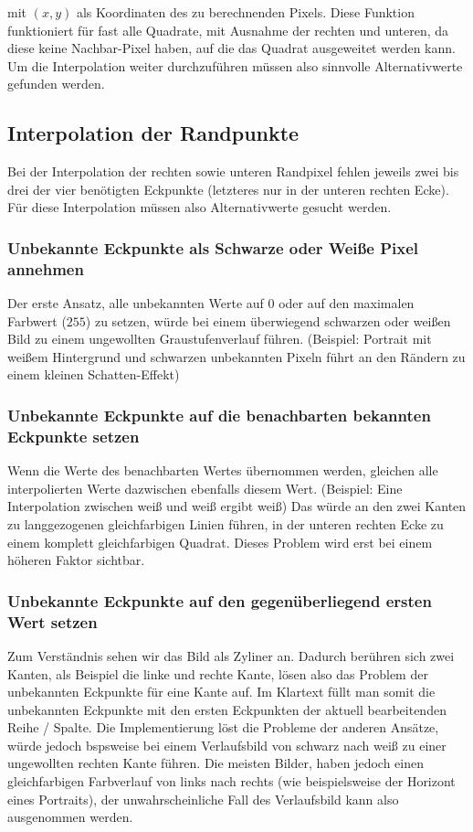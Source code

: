 \documentclass[course=erap]{aspdoc}
\begin{document}
 
mit $(x, y)$ als Koordinaten des zu berechnenden Pixels. Diese Funktion funktioniert für fast alle Quadrate, mit Ausnahme der rechten und unteren, da diese keine Nachbar-Pixel haben, auf die das Quadrat ausgeweitet werden kann. Um die Interpolation weiter durchzuführen müssen also sinnvolle Alternativwerte gefunden werden.

\subsection{Interpolation der Randpunkte}
Bei der Interpolation der rechten sowie unteren Randpixel fehlen jeweils zwei bis drei der vier benötigten Eckpunkte (letzteres nur in der unteren rechten Ecke). Für diese Interpolation müssen also Alternativwerte gesucht werden.

\subsubsection{Unbekannte Eckpunkte als Schwarze oder Weiße Pixel annehmen}
Der erste Ansatz, alle unbekannten Werte auf $0$ oder auf den maximalen Farbwert ($255$) zu setzen, würde bei einem überwiegend schwarzen oder weißen Bild zu einem ungewollten Graustufenverlauf führen. (Beispiel: Portrait mit weißem Hintergrund und schwarzen unbekannten Pixeln führt an den Rändern zu einem kleinen Schatten-Effekt)

\subsubsection{Unbekannte Eckpunkte auf die benachbarten bekannten Eckpunkte setzen}
Wenn die Werte des benachbarten Wertes übernommen werden, gleichen alle interpolierten Werte dazwischen ebenfalls diesem Wert. (Beispiel: Eine Interpolation zwischen weiß und weiß ergibt weiß) Das würde an den zwei Kanten zu langgezogenen gleichfarbigen Linien führen, in der unteren rechten Ecke zu einem komplett gleichfarbigen Quadrat. Dieses Problem wird erst bei einem höheren Faktor sichtbar.

\subsubsection{Unbekannte Eckpunkte auf den gegenüberliegend ersten Wert setzen}
Zum Verständnis sehen wir das Bild als Zyliner an. Dadurch berühren sich zwei Kanten, als Beispiel die linke und rechte Kante, lösen also das Problem der unbekannten Eckpunkte für eine Kante auf. Im Klartext füllt man somit die unbekannten Eckpunkte mit den ersten Eckpunkten der aktuell bearbeitenden Reihe / Spalte. Die Implementierung löst die Probleme der anderen Ansätze, würde jedoch bspsweise bei einem Verlaufsbild von schwarz nach weiß zu einer ungewollten rechten Kante führen. Die meisten Bilder, haben jedoch einen gleichfarbigen Farbverlauf von links nach rechts (wie beispielsweise der Horizont eines Portraits), der unwahrscheinliche Fall des Verlaufsbild kann also ausgenommen werden.
\end{document}
